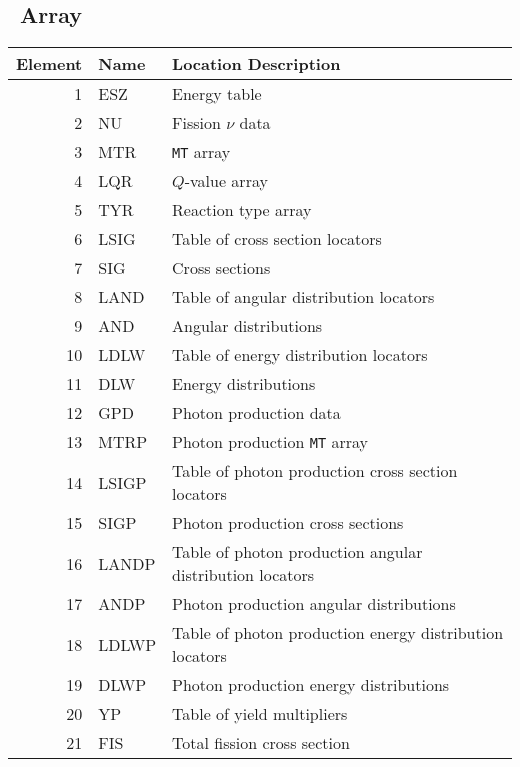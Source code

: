 
\subsection{\JXS\ Array}\label{sec:JXSContinuousEnergyNeutron}
\begin{table} \centering
  \begin{tabular}{rll}
    \toprule
    Element  & Name   & Location Description \\
    \midrule
    1        & ESZ    & Energy table \\
    2        & NU     & Fission $\nu$ data \\
    3        & MTR    & \texttt{MT} array \\
    4        & LQR    & $Q$-value array \\
    5        & TYR    & Reaction type array \\
    6        & LSIG   & Table of cross section locators \\
    7        & SIG    & Cross sections \\
    8        & LAND   & Table of angular distribution locators \\
    9        & AND    & Angular distributions \\
    10       & LDLW   & Table of energy distribution locators \\
    11       & DLW    & Energy distributions \\
    12       & GPD    & Photon production data \\
    13       & MTRP   & Photon production \texttt{MT} array \\
    14       & LSIGP  & Table of photon production cross section locators \\
    15       & SIGP   & Photon production cross sections \\
    16       & LANDP  & Table of photon production angular distribution locators \\
    17       & ANDP   & Photon production angular distributions \\
    18       & LDLWP  & Table of photon production energy distribution locators \\
    19       & DLWP   & Photon production energy distributions \\
    20       & YP     & Table of yield multipliers \\
    21       & FIS    & Total fission cross section \\

\end{tabular}
\end{table}
